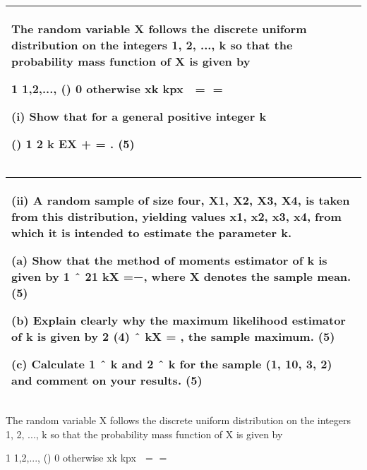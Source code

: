 \documentclass[a4paper,12pt]{article}
\begin{document}
\begin{table}[ht!]
     \centering
     \begin{tabular}{|p{15cm}|}
     \hline        
The random variable X follows the discrete uniform distribution on the integers 1, 2, ..., k so that the probability mass function of X is given by 
 
 
1
1,2,...,
()
0 otherwise
xk
kpx  = =   
 
 
(i) Show that for a general positive integer k 
 
 () 1 2 k EX + = . 
(5) 
 
 
 \\ \hline
      \end{tabular}
    \end{table}
    
  \begin{table}[ht!]
     \centering
     \begin{tabular}{|p{15cm}|}
     \hline  
(ii) A random sample of size four, X1, X2, X3, X4, is taken from this distribution, yielding values x1, x2, x3, x4, from which it is intended to estimate the parameter k. 
 
(a) Show that the method of moments estimator of k is given by 
1 ˆ 21 kX =−, where X denotes the sample mean. 
(5) 
 
(b) Explain clearly why the maximum likelihood estimator of k is given by 2 (4) ˆ kX = , the sample maximum. (5) 
 
(c) Calculate 1 ˆ k and 2 ˆ k for the sample (1, 10, 3, 2) and comment on your results. (5) \\ \hline 
      \end{tabular}
    \end{table}
\begin{framed}
The random variable X follows the discrete uniform distribution on the integers 1, 2, ..., k so that the probability mass function of X is given by 
 
 
1
1,2,...,
()
0 otherwise
xk
kpx  = =   
 
\end{framed}
\end{document}
